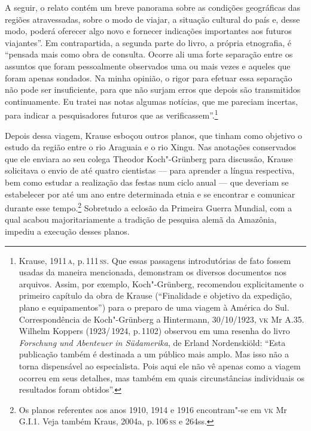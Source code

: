 A seguir, o relato
contém um breve panorama sobre as condições geográficas das regiões
atravessadas, sobre o modo de viajar, a situação cultural do país e,
desse modo, poderá oferecer algo novo e fornecer indicações importantes
aos futuros viajantes''. Em contrapartida, a segunda parte do livro, a
própria etnografia, é ``pensada mais como obra de consulta. Ocorre ali
uma forte separação entre os assuntos que foram pessoalmente observados
uma ou mais vezes e aqueles que foram apenas sondados. Na minha opinião,
o rigor para efetuar essa separação não pode ser insuficiente, para que
não surjam erros que depois são transmitidos continuamente. Eu tratei
nas notas algumas notícias, que me pareciam incertas, para indicar a
pesquisadores futuros que as verificassem''.\footnote{Krause, 1911\,\textsc{a}, p.\,111\,\textsc{ss}. Que essas passagens introdutórias de fato fossem
  usadas da maneira mencionada, demonstram os diversos documentos nos
  arquivos. Assim, por exemplo, Koch"-Grünberg, recomendou
  explicitamente o primeiro capítulo da obra de Krause (``Finalidade e objetivo da
  expedição, plano e equipamentos'') para o preparo de uma viagem à
  América do Sul. Correspondência de Koch"-Grünberg a Hintermann,
  30/10/1923, \textsc{vk} Mr A.35. Wilhelm Koppers (1923/\,1924, p.\,1102) observou em
  uma resenha do livro \emph{Forschung und Abenteuer in Südamerika}, de Erland Nordenskiöld:
  ``Esta publicação também é destinada a um público mais amplo. Mas isso
  não a torna dispensável ao especialista. Pois aqui ele não vê apenas
  como a viagem ocorreu em seus detalhes, mas também em quais
  circunstâncias individuais os resultados foram obtidos''.}

Depois dessa viagem, Krause esboçou outros planos, que tinham como
objetivo o estudo da região entre o rio Araguaia e o rio Xingu. Nas
anotações conservados que ele enviara ao seu colega Theodor
Koch"-Grünberg para discussão, Krause solicitava o envio de até quatro
cientistas --- para aprender a língua respectiva, bem como estudar a
realização das festas num ciclo anual --- que deveriam se estabelecer por
até um ano entre determinada etnia e se encontrar e comunicar durante
esse tempo.\footnote{Os planos referentes aos anos 1910, 1914 e 1916
  encontram"-se em \textsc{vk} Mr G.I.1. Veja também Kraus, 2004a, p.\,106\,\textsc{ss} e
  264ss.} Sobretudo a eclosão da Primeira Guerra Mundial, com a qual
acabou majoritariamente a tradição de pesquisa alemã da Amazônia,
impediu a execução desses planos.

